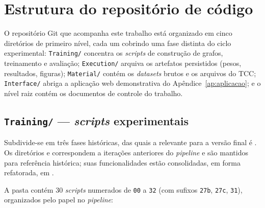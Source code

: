 \chapter{Estrutura do reposit\'orio de c\'odigo}
\label{ap:repo}

O reposit\'orio Git que acompanha este trabalho est\'a organizado em
cinco diret\'orios de primeiro n\'ivel, cada um cobrindo uma fase
distinta do ciclo experimental: \texttt{Training/} concentra os
\emph{scripts} de constru\c{c}\~ao de grafos, treinamento e
avalia\c{c}\~ao; \texttt{Execution/} arquiva os artefatos persistidos
(pesos, resultados, figuras); \texttt{Material/} cont\'em os
\emph{datasets} brutos e os arquivos do TCC; \texttt{Interface/}
abriga a aplica\c{c}\~ao web demonstrativa do
Ap\^endice~\ref{ap:aplicacao}; e o n\'ivel raiz cont\'em os
documentos de controle do trabalho.

\section{\texttt{Training/} --- \emph{scripts} experimentais}
\label{sec:ap_training}

Subdivide-se em tr\^es fases hist\'oricas, das quais a relevante para
a vers\~ao final \'e . Os
diret\'orios  e 
correspondem a itera\c{c}\~oes anteriores do \emph{pipeline} e s\~ao
mantidos para refer\^encia hist\'orica; suas funcionalidades est\~ao
consolidadas, em forma refatorada, em
.

A pasta  cont\'em $30$
\emph{scripts} numerados de \texttt{00} a \texttt{32} (com sufixos
\texttt{27b}, \texttt{27c}, \texttt{31}), organizados pelo papel no
\emph{pipeline}:

